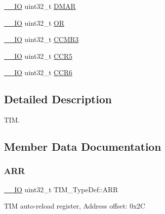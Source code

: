 \begin{DoxyCompactItemize}
\mbox{\hyperlink{core__sc300_8h_aec43007d9998a0a0e01faede4133d6be}{\+\_\+\+\_\+\+IO}} uint32\+\_\+t \mbox{\hyperlink{struct_t_i_m___type_def_afb7114ac49dba07ba5d250c507dbf23d}{D\+M\+AR}}
\item 
\mbox{\hyperlink{core__sc300_8h_aec43007d9998a0a0e01faede4133d6be}{\+\_\+\+\_\+\+IO}} uint32\+\_\+t \mbox{\hyperlink{struct_t_i_m___type_def_acb0e8a4efa46dac4a2fb1aa3d45924fd}{OR}}
\item 
\mbox{\hyperlink{core__sc300_8h_aec43007d9998a0a0e01faede4133d6be}{\+\_\+\+\_\+\+IO}} uint32\+\_\+t \mbox{\hyperlink{struct_t_i_m___type_def_ac0dcd8f9118b07b16cd79d03cb1a0904}{C\+C\+M\+R3}}
\item 
\mbox{\hyperlink{core__sc300_8h_aec43007d9998a0a0e01faede4133d6be}{\+\_\+\+\_\+\+IO}} uint32\+\_\+t \mbox{\hyperlink{struct_t_i_m___type_def_af30dc563e6c1b7b7e01e393feb484080}{C\+C\+R5}}
\item 
\mbox{\hyperlink{core__sc300_8h_aec43007d9998a0a0e01faede4133d6be}{\+\_\+\+\_\+\+IO}} uint32\+\_\+t \mbox{\hyperlink{struct_t_i_m___type_def_a374f851b5f1097a3ebd3f494ded6512a}{C\+C\+R6}}
\end{DoxyCompactItemize}


\subsection{Detailed Description}
T\+IM. 

\subsection{Member Data Documentation}
\mbox{\label{struct_t_i_m___type_def_a6a42766a6ca3c7fe10a810ebd6b9d627}} 
\subsubsection{\texorpdfstring{ARR}{ARR}}
{\footnotesize\ttfamily \mbox{\hyperlink{core__sc300_8h_aec43007d9998a0a0e01faede4133d6be}{\+\_\+\+\_\+\+IO}} uint32\+\_\+t T\+I\+M\+\_\+\+Type\+Def\+::\+A\+RR}

T\+IM auto-\/reload register, Address offset\+: 0x2C \mbox{\label{struct_t_i_m___type_def_a137d3523b60951eca1e4130257b2b23d}} 
